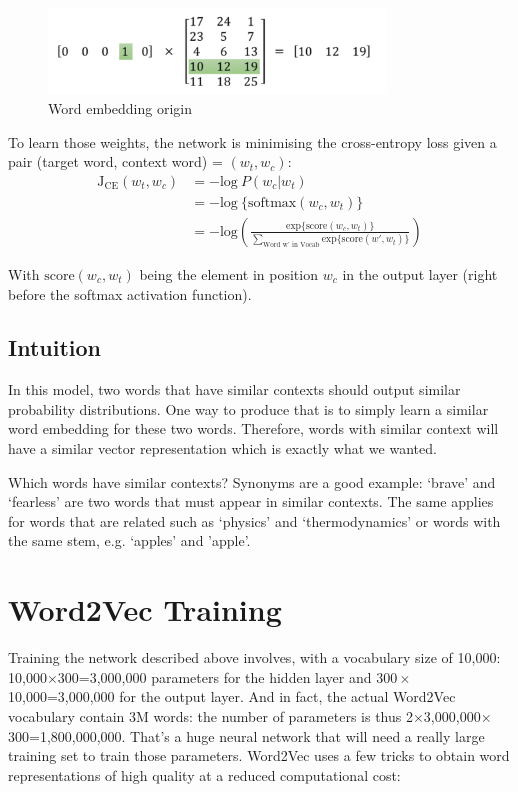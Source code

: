 \begin{figure}[H]
    \centering
    \includegraphics[width=0.8\textwidth]{Images/onehot-matrix.png}
    \caption{Word embedding origin\cite{word2vec-architecture}}
\end{figure}

\newpage
To learn those weights, the network is minimising the cross-entropy loss given a pair (target word, context word) = $(w_t, w_c)$:
\begin{align}
    \text{J}_{\text{CE}}(w_t, w_c)   &=  -\text{log}~P(w_c | w_t) \nonumber\\
    &= -\text{log}~\{\text{softmax}(w_c, w_t)\}\nonumber\\
    &= -\text{log}\left(\frac{\text{exp}\{\text{score}(w_c, w_t)\}}{\sum_{\text{Word w' in Vocab}}\text{exp}\{\text{score}(w', w_t)\}} \right)
    \label{cross-entropy}
\end{align}

With $\text{score}(w_c, w_t)$ being the element in position $w_c$ in the output layer (right before the softmax activation function).

\subsection{Intuition}
In this model, two words that have similar contexts should output similar probability distributions. One way to produce that is to simply learn a similar word embedding for these two words. Therefore, words with similar context will have a similar vector representation which is exactly what we wanted.

Which words have similar contexts? Synonyms are a good example: `brave' and `fearless' are two words that must appear in similar contexts. The same applies for words that are related such as `physics' and `thermodynamics' or words with the same stem, e.g. `apples' and 'apple'. 

\newpage
\section{Word2Vec Training}
Training the network described above involves, with a vocabulary size of 10,000: 10,000$\times300$=3,000,000 parameters for the hidden layer and $300\times$10,000=3,000,000 for the output layer. And in fact, the actual Word2Vec vocabulary contain 3M words: the number of parameters is thus 2$\times$3,000,000$\times$300=1,800,000,000. That's a huge neural network that will need a really large training set to train those parameters. Word2Vec uses a few tricks to obtain word representations of high quality at a reduced computational cost:

